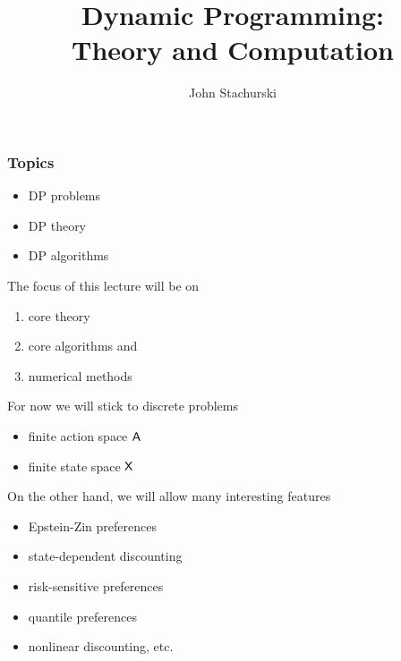 \documentclass[dvipsnames]{beamer}
\title{Dynamic Programming: \\ Theory and Computation}
\author{John Stachurski}
\date[\today]{}
\begin{document}
\begin{frame}
  \titlepage
\end{frame}


\begin{frame}
    \frametitle{Topics}

    \begin{itemize}
        \item DP problems
            \vspace{0.3em}
        \item DP theory
            \vspace{0.3em}
        \item DP algorithms 
    \end{itemize}

    \medskip
    \medskip
    
    The focus of this lecture will be on 
    \begin{enumerate}
        \item core theory
        \item core algorithms and 
        \item numerical methods
    \end{enumerate}


\end{frame}


\begin{frame}
    
    For now we will stick to discrete problems

    \begin{itemize}
        \item finite action space $\mathsf A$
        \item finite state space $\mathsf X$
    \end{itemize}

    \medskip

    On the other hand, we will allow many interesting features
    \begin{itemize}
        \item Epstein-Zin preferences
        \item state-dependent discounting
        \item risk-sensitive preferences
        \item quantile preferences
        \item nonlinear discounting, etc.
    \end{itemize}

\end{frame}
\end{document}
